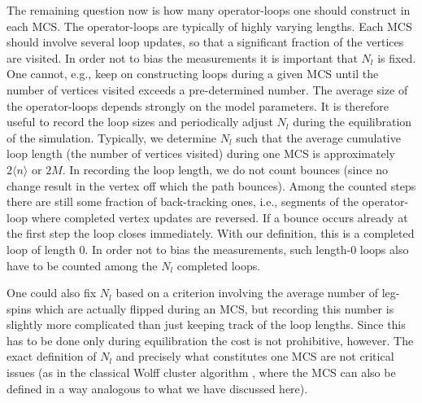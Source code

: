 \documentclass[10pt,pre,aps,twocolumn,showpacs,superscriptaddress,
floatfix]{revtex4}
\begin{document}
The remaining question now is how many operator-loops one should construct 
in each MCS. The operator-loops are typically of highly varying lengths. 
Each MCS should involve several loop updates, so that a significant fraction 
of the vertices are visited.  In order not to bias the measurements it is 
important that $N_l$ is fixed. One cannot, e.g., keep on constructing loops 
during a given MCS until the number of vertices visited exceeds a 
pre-determined number. The average size of the operator-loops depends strongly
on the model parameters. It is therefore useful to record the loop sizes and 
periodically adjust $N_l$ during the equilibration of the simulation. 
Typically, we determine $N_l$ such that the average cumulative loop length 
(the number of vertices visited) during one MCS is approximately 
$2\langle n\rangle$  or $2M$. In recording the loop length, we do not count 
bounces (since no change result in the vertex off which the path bounces). 
Among the counted steps there are still some fraction of back-tracking ones, 
i.e., segments of the operator-loop where completed vertex updates are 
reversed. If a bounce occurs already at the first step the loop closes 
immediately. With our definition, this is a completed loop of length $0$. In 
order not to bias the measurements, such length-0 loops also have to be 
counted among the $N_l$ completed loops. 

One could also fix $N_l$ based on a criterion involving the average number of 
leg-spins which are actually flipped during an MCS, but recording this 
number is slightly more complicated than just keeping track of the loop 
lengths. Since this has to be done only during equilibration the cost
is not prohibitive, however. The exact definition of $N_l$ and precisely what 
constitutes one MCS are not critical issues (as in the classical Wolff cluster
algorithm \cite{wolff}, where the MCS can also be defined in a way analogous 
to what we have discussed here).
\end{document}
